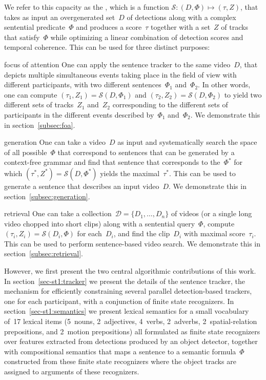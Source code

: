 We refer to this capacity as the , which is a
function $\mathcal{S}:(D,\Phi)\mapsto(\tau,Z)$, that takes as input an
overgenerated set~$D$ of detections along with a complex sentential
predicate~$\Phi$ and produces a score~$\tau$ together with a set~$Z$ of tracks
that satisfy~$\Phi$ while optimizing a linear combination of detection scores
and temporal coherence.
%
This can be used for three distinct purposes:
%
\begin{compactdesc}
\item[focus of attention] One can apply the sentence tracker to the same
  video~$D$, that depicts multiple simultaneous events taking place in the
  field of view with different participants, with two different
  sentences~$\Phi_1$ and~$\Phi_2$.
  In other words, one can compute $(\tau_1,Z_1)=\mathcal{S}(D,\Phi_1)$ and
  $(\tau_2,Z_2)=\mathcal{S}(D,\Phi_2)$ to yield two different sets of
  tracks~$Z_1$ and~$Z_2$ corresponding to the different sets of participants in
  the different events described by~$\Phi_1$ and~$\Phi_2$.
  We demonstrate this in section~\ref{subsec:foa}.
\item[generation] One can take a video~$D$ as input and systematically search
  the space of all possible~$\Phi$ that correspond to sentences that can be
  generated by a context-free grammar and find that sentence that corresponds
  to the~$\Phi^{*}$ for which $(\tau^{*},Z^{*})=\mathcal{S}(D,\Phi^{*})$ yields
  the maximal~$\tau^{*}$.
  This can be used to generate a sentence that describes an input video~$D$.
  We demonstrate this in section~\ref{subsec:generation}.
\item[retrieval] One can take a collection~$\mathcal{D}=\{D_1,\ldots,D_n\}$ of
  videos (or a single long video chopped into short clips) along with a
  sentential query~$\Phi$, compute $(\tau_i,Z_i)=\mathcal{S}(D_i,\Phi)$ for
  each~$D_i$, and find the clip~$D_i$ with maximal score~$\tau_i$.
  This can be used to perform sentence-based video search.
  We demonstrate this in section~\ref{subsec:retrieval}.
\end{compactdesc}
%
However, we first present the two central algorithmic contributions of this
work.
%
In section~\ref{sec-st1:tracker} we present the details of the sentence tracker,
the mechanism for efficiently constraining several parallel detection-based
trackers, one for each participant, with a conjunction of finite state
recognizers.
%
In section~\ref{sec-st1:semantics} we present lexical semantics for a small
vocabulary of~17 lexical items (5~nouns, 2~adjectives, 4~verbs, 2~adverbs,
2~spatial-relation prepositions, and 2~motion prepositions) all formulated as
finite state recognizers over features extracted from detections produced by an
object detector, together with compositional semantics that maps a sentence to
a semantic formula~$\Phi$ constructed from these finite state recognizers where
the object tracks are assigned to arguments of these recognizers.


